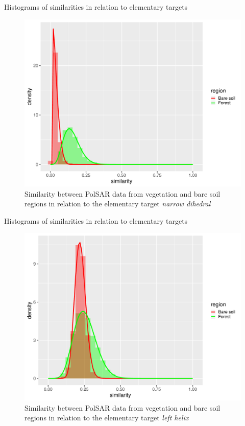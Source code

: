 \documentclass[10pt]{beamer}
\begin{document}
\begin{frame}[fragile]{Histograms of similarities in relation to elementary targets}

\begin{figure}
    \centering
    \includegraphics[width = .6\linewidth]{nd.pdf}
    \caption{Similarity between PolSAR data from vegetation and bare soil regions in relation to the elementary target \textit{narrow dihedral}}
    \label{fig:nd}
\end{figure}
    
\end{frame}

\begin{frame}[fragile]{Histograms of similarities in relation to elementary targets}

\begin{figure}
    \centering
    \includegraphics[width = .6\linewidth]{lh.pdf}
    \caption{Similarity between PolSAR data from vegetation and bare soil regions in relation to the elementary target \textit{left helix}}
    \label{fig:lh}
\end{figure}
    
\end{frame}
\end{document}
